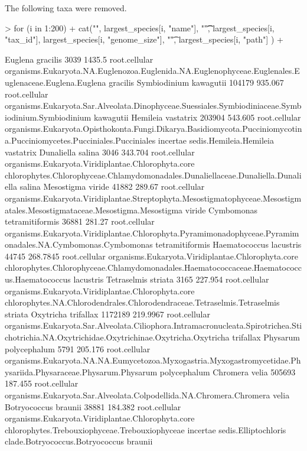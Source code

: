\documentclass{article}
\begin{document}
The following taxa were removed.
\begin{Schunk}
\begin{Sinput}
> for (i in 1:200) {
+    cat("\n", largest_species[i, "name"], "\t\t",  largest_species[i, "tax_id"], largest_species[i, "genome_size"], "\t",  largest_species[i, "path"] )
+  }
\end{Sinput}
\begin{Soutput}
 Euglena gracilis 		 3039 1435.5 	 root.cellular organisms.Eukaryota.NA.Euglenozoa.Euglenida.NA.Euglenophyceae.Euglenales.Euglenaceae.Euglena.Euglena gracilis
 Symbiodinium kawagutii 		 104179 935.067 	 root.cellular organisms.Eukaryota.Sar.Alveolata.Dinophyceae.Suessiales.Symbiodiniaceae.Symbiodinium.Symbiodinium kawagutii
 Hemileia vastatrix 		 203904 543.605 	 root.cellular organisms.Eukaryota.Opisthokonta.Fungi.Dikarya.Basidiomycota.Pucciniomycotina.Pucciniomycetes.Pucciniales.Pucciniales incertae sedis.Hemileia.Hemileia vastatrix
 Dunaliella salina 		 3046 343.704 	 root.cellular organisms.Eukaryota.Viridiplantae.Chlorophyta.core chlorophytes.Chlorophyceae.Chlamydomonadales.Dunaliellaceae.Dunaliella.Dunaliella salina
 Mesostigma viride 		 41882 289.67 	 root.cellular organisms.Eukaryota.Viridiplantae.Streptophyta.Mesostigmatophyceae.Mesostigmatales.Mesostigmataceae.Mesostigma.Mesostigma viride
 Cymbomonas tetramitiformis 		 36881 281.27 	 root.cellular organisms.Eukaryota.Viridiplantae.Chlorophyta.Pyramimonadophyceae.Pyramimonadales.NA.Cymbomonas.Cymbomonas tetramitiformis
 Haematococcus lacustris 		 44745 268.7845 	 root.cellular organisms.Eukaryota.Viridiplantae.Chlorophyta.core chlorophytes.Chlorophyceae.Chlamydomonadales.Haematococcaceae.Haematococcus.Haematococcus lacustris
 Tetraselmis striata 		 3165 227.954 	 root.cellular organisms.Eukaryota.Viridiplantae.Chlorophyta.core chlorophytes.NA.Chlorodendrales.Chlorodendraceae.Tetraselmis.Tetraselmis striata
 Oxytricha trifallax 		 1172189 219.9967 	 root.cellular organisms.Eukaryota.Sar.Alveolata.Ciliophora.Intramacronucleata.Spirotrichea.Stichotrichia.NA.Oxytrichidae.Oxytrichinae.Oxytricha.Oxytricha trifallax
 Physarum polycephalum 		 5791 205.176 	 root.cellular organisms.Eukaryota.NA.NA.Eumycetozoa.Myxogastria.Myxogastromycetidae.Physariida.Physaraceae.Physarum.Physarum polycephalum
 Chromera velia 		 505693 187.455 	 root.cellular organisms.Eukaryota.Sar.Alveolata.Colpodellida.NA.Chromera.Chromera velia
 Botryococcus braunii 		 38881 184.382 	 root.cellular organisms.Eukaryota.Viridiplantae.Chlorophyta.core chlorophytes.Trebouxiophyceae.Trebouxiophyceae incertae sedis.Elliptochloris clade.Botryococcus.Botryococcus braunii

\end{Soutput}
\end{Schunk}
\end{document}
